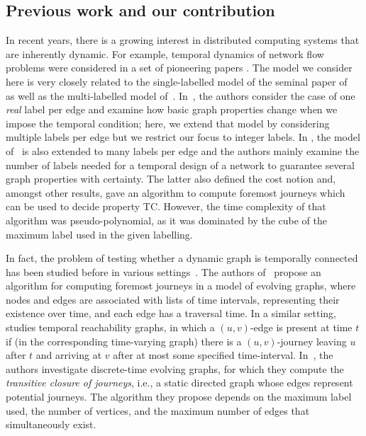 \documentclass[a4paper,UKenglish]{article}
\begin{document}
\subsection{Previous work and our contribution}\label{sec:full_paper_related}
In recent years, there is a growing interest in distributed computing systems that are inherently dynamic. For example, temporal dynamics of network flow problems were considered in a set of pioneering papers \cite{skutella1, skutella2,woeginger, tardos}. The model we consider here is very closely related to the single-labelled model of the seminal paper of~\cite{kempe} as well as the multi-labelled model of~\cite{spirakis}. In~\cite{kempe}, the authors consider the case of one \emph{real} label per edge and examine how basic graph properties change when we impose the temporal condition; here, we extend that model by considering multiple labels per edge but we restrict our focus to integer labels. In \cite{spirakis}, the model of~\cite{kempe} is also extended to many labels per edge and the authors mainly examine the number of labels needed for a temporal design of a network to guarantee several graph properties with certainty. The latter also defined the cost notion and, amongst other results, gave an algorithm to compute foremost journeys which can be used to decide property TC. However, the time complexity of that algorithm was pseudo-polynomial, as it was dominated by the cube of the maximum label used in the given labelling.

In fact, the problem of testing whether a dynamic graph is temporally connected has been studied before in various settings~\cite{xuan,whitbeck,barjon}. The authors of~\cite{xuan} propose an algorithm for computing foremost journeys in a model of evolving graphs, where nodes and edges are associated with lists of time intervals, representing their existence over time, and each edge has a traversal time. In a similar setting,~\cite{whitbeck} studies temporal reachability graphs, in which a $(u,v)$-edge is present at time $t$ if (in the corresponding time-varying graph) there is a $(u,v)$-journey leaving $u$ after $t$ and arriving at $v$ after at most some specified time-interval. In~\cite{barjon}, the authors investigate discrete-time evolving graphs, for which they compute the \emph{transitive closure of journeys}, i.e., a static directed graph whose edges represent potential journeys. The algorithm they propose depends on the maximum label used, the number of vertices, and the maximum number of edges that simultaneously exist.
\end{document}
